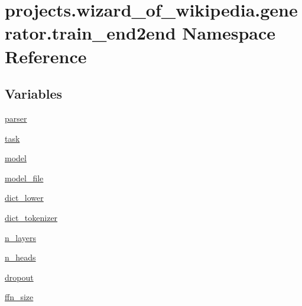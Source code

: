 \hypertarget{namespaceprojects_1_1wizard__of__wikipedia_1_1generator_1_1train__end2end}{}\section{projects.\+wizard\+\_\+of\+\_\+wikipedia.\+generator.\+train\+\_\+end2end Namespace Reference}
\label{namespaceprojects_1_1wizard__of__wikipedia_1_1generator_1_1train__end2end}
\subsection*{Variables}
\begin{DoxyCompactItemize}
\item 
\hyperlink{namespaceprojects_1_1wizard__of__wikipedia_1_1generator_1_1train__end2end_aad25450de311c4a13fa026e688e4040c}{parser}
\item 
\hyperlink{namespaceprojects_1_1wizard__of__wikipedia_1_1generator_1_1train__end2end_a9a6ebb0da56fc43ddb0187a11d92e55a}{task}
\item 
\hyperlink{namespaceprojects_1_1wizard__of__wikipedia_1_1generator_1_1train__end2end_a4e43bf1ff52d72910624baa4a0051896}{model}
\item 
\hyperlink{namespaceprojects_1_1wizard__of__wikipedia_1_1generator_1_1train__end2end_a0d3b2244a86e6165771256742f676134}{model\+\_\+file}
\item 
\hyperlink{namespaceprojects_1_1wizard__of__wikipedia_1_1generator_1_1train__end2end_a14627d57d1f8a1dfeeec6572c922358d}{dict\+\_\+lower}
\item 
\hyperlink{namespaceprojects_1_1wizard__of__wikipedia_1_1generator_1_1train__end2end_a851b4bea7e4f3325ecff80d210db37ef}{dict\+\_\+tokenizer}
\item 
\hyperlink{namespaceprojects_1_1wizard__of__wikipedia_1_1generator_1_1train__end2end_a404b5a275a8b2d42ce6acd0d874985dd}{n\+\_\+layers}
\item 
\hyperlink{namespaceprojects_1_1wizard__of__wikipedia_1_1generator_1_1train__end2end_a16b87179c6f81fe36ffdee6be9aa6891}{n\+\_\+heads}
\item 
\hyperlink{namespaceprojects_1_1wizard__of__wikipedia_1_1generator_1_1train__end2end_ac31504ba24ad7575985f5f516e829def}{dropout}
\item 
\hyperlink{namespaceprojects_1_1wizard__of__wikipedia_1_1generator_1_1train__end2end_a2823f48ac297bfce509e32b755611a06}{ffn\+\_\+size}

\end{DoxyCompactItemize}
